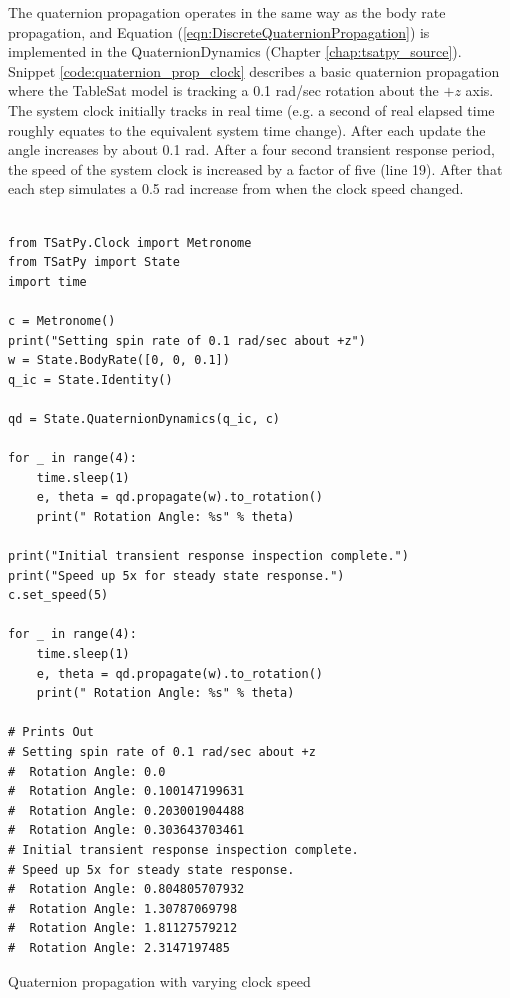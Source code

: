 The quaternion propagation operates in the same way as the body rate propagation, and Equation (\ref{eqn:DiscreteQuaternionPropagation}) is implemented in the QuaternionDynamics (Chapter \ref{chap:tsatpy_source}).  Snippet \ref{code:quaternion_prop_clock} describes a basic quaternion propagation where the TableSat model is tracking a 0.1 rad/sec rotation about the $+z$ axis.  The system clock initially tracks in real time (e.g. a second of real elapsed time roughly equates to the equivalent system time change).  After each update the angle increases by about 0.1 rad.  After a four second transient response period, the speed of the system clock is increased by a factor of five (line 19).  After that each step simulates a 0.5 rad increase from when the clock speed changed.

\begin{listing}[H]
\begin{singlespace}
  \begin{verbatim}

from TSatPy.Clock import Metronome
from TSatPy import State
import time

c = Metronome()
print("Setting spin rate of 0.1 rad/sec about +z")
w = State.BodyRate([0, 0, 0.1])
q_ic = State.Identity()

qd = State.QuaternionDynamics(q_ic, c)

for _ in range(4):
    time.sleep(1)
    e, theta = qd.propagate(w).to_rotation()
    print(" Rotation Angle: %s" % theta)

print("Initial transient response inspection complete.")
print("Speed up 5x for steady state response.")
c.set_speed(5)

for _ in range(4):
    time.sleep(1)
    e, theta = qd.propagate(w).to_rotation()
    print(" Rotation Angle: %s" % theta)

# Prints Out
# Setting spin rate of 0.1 rad/sec about +z
#  Rotation Angle: 0.0
#  Rotation Angle: 0.100147199631
#  Rotation Angle: 0.203001904488
#  Rotation Angle: 0.303643703461
# Initial transient response inspection complete.
# Speed up 5x for steady state response.
#  Rotation Angle: 0.804805707932
#  Rotation Angle: 1.30787069798
#  Rotation Angle: 1.81127579212
#  Rotation Angle: 2.3147197485
  \end{verbatim}
\caption{Quaternion propagation with varying clock speed}
\label{code:quaternion_prop_clock}
\nocite{minted}
\end{singlespace}
\end{listing}

